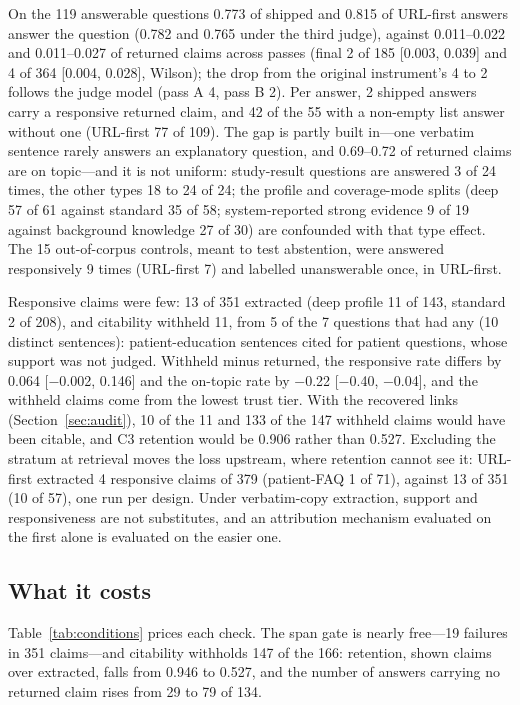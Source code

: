 \documentclass[conference,a4paper]{IEEEtran}
\begin{document}
On the 119 answerable questions \num{0.773} of shipped and \num{0.815} of URL-first answers
answer the question (\num{0.782} and \num{0.765} under the third judge), against
\numrange{0.011}{0.022} and \numrange{0.011}{0.027} of returned claims across passes (final 2
of 185 [\num{0.003}, \num{0.039}] and 4 of 364 [\num{0.004}, \num{0.028}], Wilson); the drop
from the original instrument's 4 to 2 follows the judge model (pass A 4, pass B 2). Per
answer, 2 shipped answers carry a responsive returned claim, and 42 of the 55 with a non-empty
list answer without one (URL-first 77 of 109). The gap is partly built in---one verbatim
sentence rarely answers an explanatory question, and \numrange{0.69}{0.72} of returned claims
are on topic---and it is not uniform: study-result questions are answered 3 of 24 times, the
other types 18 to 24 of 24; the profile and coverage-mode splits (deep 57 of 61 against
standard 35 of 58; system-reported strong evidence 9 of 19 against background knowledge 27
of 30) are confounded with that type effect. The 15 out-of-corpus controls, meant to test
abstention, were answered responsively 9 times (URL-first 7) and labelled unanswerable once,
in URL-first.

Responsive claims were few: 13 of 351 extracted (deep profile 11 of 143, standard 2 of 208),
and citability withheld 11, from 5 of the 7 questions that had any (10 distinct sentences):
patient-education sentences cited for patient questions, whose support was not judged.
Withheld minus returned, the responsive rate differs by \num{0.064} [\num{-0.002},
\num{0.146}] and the on-topic rate by \num{-0.22} [\num{-0.40}, \num{-0.04}], and the withheld
claims come from the lowest trust tier. With the recovered links (Section~\ref{sec:audit}), 10 of the 11 and
133 of the 147 withheld claims would have been citable, and C3 retention would be \num{0.906}
rather than \num{0.527}. Excluding the stratum at retrieval moves the loss upstream, where
retention cannot see it: URL-first extracted 4 responsive claims of 379 (patient-FAQ 1 of
71), against 13 of 351 (10 of 57), one run per design. Under verbatim-copy extraction, support and responsiveness
are not substitutes, and an attribution mechanism evaluated on the first alone is evaluated on
the easier one.

\subsection{What it costs}
Table~\ref{tab:conditions} prices each check. The span gate is nearly free---\num{19}
failures in \num{351} claims---and citability withholds \num{147} of the \num{166}: retention,
shown claims over extracted, falls from \num{0.946} to \num{0.527}, and the number of answers
carrying no returned claim rises from 29 to 79 of 134.
\end{document}
